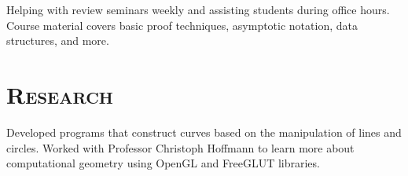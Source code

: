 \begin{resume}
\begin{position}
  Helping with review seminars weekly and assisting students during office hours. Course material covers basic proof techniques, asymptotic notation, data structures, and more.
\end{position}


\section{\textsc{Research}}

\begin{position}
    Developed programs that construct curves based on the manipulation of lines and circles. Worked with Professor Christoph Hoffmann to learn more about computational geometry using OpenGL and FreeGLUT libraries. 
\end{position}




\end{resume}
